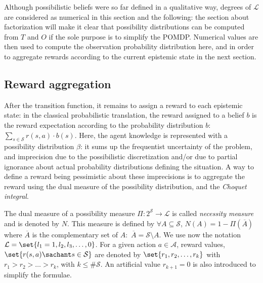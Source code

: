 Although possibilistic beliefs were so far defined in 
a qualitative way, degrees 
of $\mathcal{L}$ are considered as numerical in this section and
the following: the section about factorization will make it clear that
possibility distributions can be computed from $T$ and $O$ if the
sole purpose is to simplify the POMDP.
Numerical values are then used to compute the observation probability distribution
here, and in order to aggregate rewards according to the current epistemic state 
in the next section.

\subsection{Reward aggregation}
\label{aggreg}
After the transition function, it remains to assign a reward to each epistemic state:
in the classical probabilistic translation, the reward assigned to a belief $b$ is
the reward expectation according to the probability distribution $b$: $\sum_{s \in \mathcal{S}} r(s,a) \cdot b(s)$.
Here, the agent knowledge is represented with a possibility distribution $\beta$: 
it sums up the frequentist uncertainty of the problem, 
and imprecision due to the possibilistic discretization 
and/or due to partial ignorance about actual probability distributions
defining the situation.
A way to define a reward being pessimistic about these imprecisions is to aggregate the
reward using the dual measure of the possibility distribution, and the \textit{Choquet integral}.

The dual measure of a possibility measure $\Pi:2^{\mathcal{S}} \rightarrow \mathcal{L}$
is called \textit{necessity measure} and is denoted by $N$. This measure is defined
by $\forall A \subseteq \mathcal{S}$, $N(A) = 1 - \Pi(\overline{A})$ where $\overline{A}$
is the complementary set of $A:$ $\overline{A} = \mathcal{S} \setminus A $.
We use now the notation $\mathcal{L} = \set{ l_1=1,l_2,l_3, \ldots, 0 }$.
For a given action $a \in \mathcal{A}$, reward values, 
$\set{ r(s,a) \sachant s \in \mathcal{S} }$ are denoted by
$\set{r_1,r_2,\ldots,r_k}$ with $r_1 > r_2 > \ldots > r_k$, 
with $k \leqslant \# \mathcal{S}$. An artificial value $r_{k+1}=0$ is also
introduced to simplify the formulae.

